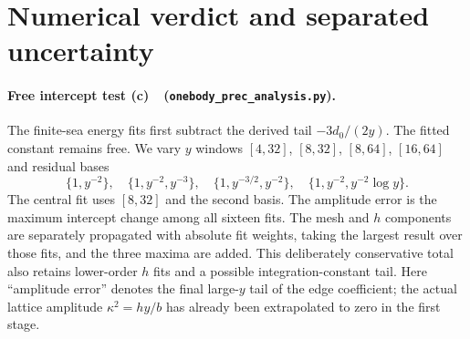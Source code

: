 \documentclass[11pt,a4paper]{article}
\newcommand{\Lc}{\textbf{(c)}\ }
\newcommand{\ana}{\texttt{onebody\_\allowbreak prec\_\allowbreak analysis.py}}
\begin{document}
\section{Numerical verdict and separated uncertainty}
\paragraph{Free intercept test \Lc\ (\ana).}
The finite-sea energy fits first subtract the derived tail $-3d_0/(2y)$.
The fitted constant remains free. We vary $y$ windows $[4,32]$, $[8,32]$,
$[8,64]$, $[16,64]$ and residual bases
\[
 \{1,y^{-2}\},\quad\{1,y^{-2},y^{-3}\},\quad
 \{1,y^{-3/2},y^{-2}\},\quad\{1,y^{-2},y^{-2}\log y\}.
\]
The central fit uses $[8,32]$ and the second basis.
The amplitude error is the maximum intercept change among all sixteen fits.
The mesh and $h$ components are separately propagated with absolute fit
weights, taking the largest result over those fits, and the three maxima
are added. This deliberately conservative total also retains lower-order
$h$ fits and a possible integration-constant tail.
Here ``amplitude error'' denotes the final large-$y$ tail of the edge
coefficient; the actual lattice amplitude $\kappa^2=hy/b$ has already
been extrapolated to zero in the first stage.
\end{document}
